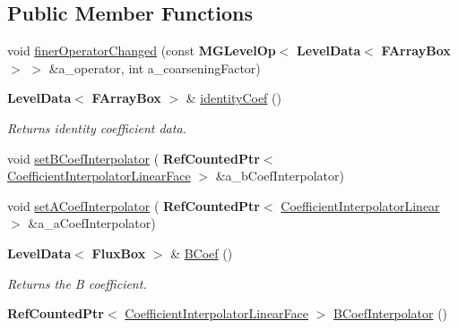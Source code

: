 \subsection*{Public Member Functions}
\begin{DoxyCompactItemize}
\item 
void \hyperlink{class_a_m_r_non_linear_multi_comp_op_ad5c79a27d60fc17c24eea9c052aa84ac}{finer\+Operator\+Changed} (const \textbf{ M\+G\+Level\+Op}$<$ \textbf{ Level\+Data}$<$ \textbf{ F\+Array\+Box} $>$ $>$ \&a\+\_\+operator, int a\+\_\+coarsening\+Factor)
\item 
\mbox{\label{class_a_m_r_non_linear_multi_comp_op_a639364f5cf0da9ec0237241639ae8404}} 
\textbf{ Level\+Data}$<$ \textbf{ F\+Array\+Box} $>$ \& \hyperlink{class_a_m_r_non_linear_multi_comp_op_a639364f5cf0da9ec0237241639ae8404}{identity\+Coef} ()
\begin{DoxyCompactList}\small\item\em Returns identity coefficient data. \end{DoxyCompactList}\item 
void \hyperlink{class_a_m_r_non_linear_multi_comp_op_a64125ca23b133e2ca86437d7b8cfad3c}{set\+B\+Coef\+Interpolator} (\textbf{ Ref\+Counted\+Ptr}$<$ \hyperlink{class_coefficient_interpolator_linear_face}{Coefficient\+Interpolator\+Linear\+Face} $>$ \&a\+\_\+b\+Coef\+Interpolator)
\item 
void \hyperlink{class_a_m_r_non_linear_multi_comp_op_afbc2843a557aa21ae1e88372dae80f9b}{set\+A\+Coef\+Interpolator} (\textbf{ Ref\+Counted\+Ptr}$<$ \hyperlink{class_coefficient_interpolator_linear}{Coefficient\+Interpolator\+Linear} $>$ \&a\+\_\+a\+Coef\+Interpolator)
\item 
\mbox{\label{class_a_m_r_non_linear_multi_comp_op_a58e58cbf6a60f356392931aaf4d6c268}} 
\textbf{ Level\+Data}$<$ \textbf{ Flux\+Box} $>$ \& \hyperlink{class_a_m_r_non_linear_multi_comp_op_a58e58cbf6a60f356392931aaf4d6c268}{B\+Coef} ()
\begin{DoxyCompactList}\small\item\em Returns the B coefficient. \end{DoxyCompactList}\item 
\mbox{\label{class_a_m_r_non_linear_multi_comp_op_a15f72d25367f2a9a8c8a5211357947d0}} 
\textbf{ Ref\+Counted\+Ptr}$<$ \hyperlink{class_coefficient_interpolator_linear_face}{Coefficient\+Interpolator\+Linear\+Face} $>$ \hyperlink{class_a_m_r_non_linear_multi_comp_op_a15f72d25367f2a9a8c8a5211357947d0}{B\+Coef\+Interpolator} ()

\end{DoxyCompactItemize}

